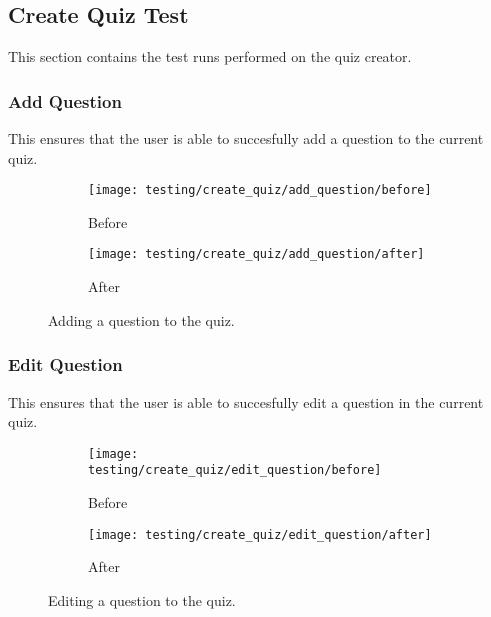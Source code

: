 \subsection{Create Quiz Test} %
\label{sub:create_quiz_test}
This section contains the test runs performed on the quiz creator.

\clearpage

\subsubsection{Add Question} %
\label{ssub:add_question}
This ensures that the user is able to succesfully add a question to the current quiz.
\begin{figure}[!htbp]
\centering
\begin{subfigure}{0.5\textwidth}
  \centering
  \texttt{[image: testing/create\_quiz/add\_question/before]}
  \caption{Before}
  \label{fig:sub1}
\end{subfigure}%
\begin{subfigure}{0.5\textwidth}
  \centering
  \texttt{[image: testing/create\_quiz/add\_question/after]}
  \caption{After}
  \label{fig:sub2}
\end{subfigure}
\caption{Adding a question to the quiz.}
\label{fig:test}
\end{figure}


\subsubsection{Edit Question} %
\label{ssub:edit_question}
This ensures that the user is able to succesfully edit a question in the current quiz.
\begin{figure}[!htbp]
\centering
\begin{subfigure}{0.5\textwidth}
  \centering
  \texttt{[image: testing/create\_quiz/edit\_question/before]}
  \caption{Before}
  \label{fig:sub1}
\end{subfigure}%
\begin{subfigure}{0.5\textwidth}
  \centering
  \texttt{[image: testing/create\_quiz/edit\_question/after]}
  \caption{After}
  \label{fig:sub2}
\end{subfigure}
\caption{Editing a question to the quiz.}
\label{fig:test}
\end{figure}


